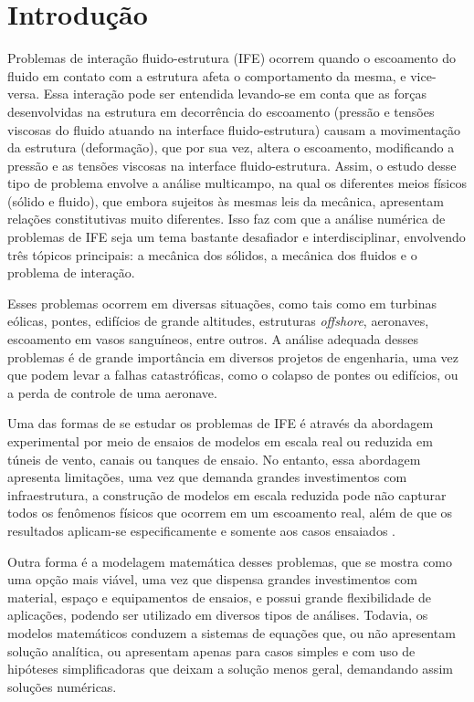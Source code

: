 \chapter{Introdução}\label{CapIntroducao}

Problemas de interação fluido-estrutura (IFE) ocorrem quando o escoamento do fluido em contato com a estrutura afeta o comportamento da mesma, e vice-versa. Essa interação pode ser entendida levando-se em conta que as forças desenvolvidas na estrutura em decorrência do escoamento (pressão e tensões viscosas do fluido atuando na interface fluido-estrutura) causam a movimentação da estrutura (deformação), que por sua vez, altera o escoamento, modificando a pressão e as tensões viscosas na interface fluido-estrutura. Assim, o estudo desse tipo de problema envolve a análise multicampo, na qual os diferentes meios físicos (sólido e fluido), que embora sujeitos às mesmas leis da mecânica, apresentam relações constitutivas muito diferentes. Isso faz com que a análise numérica de problemas de IFE seja um tema bastante desafiador e interdisciplinar, envolvendo três tópicos principais: a mecânica dos sólidos, a mecânica dos fluidos e o problema de interação.

Esses problemas ocorrem em diversas situações, como tais como em turbinas eólicas, pontes, edifícios de grande altitudes, estruturas \textit{offshore}, aeronaves, escoamento em vasos sanguíneos, entre outros. A análise adequada desses problemas é de grande importância em diversos projetos de engenharia, uma vez que podem levar a falhas catastróficas, como o colapso de pontes ou edifícios, ou a perda de controle de uma aeronave.

Uma das formas de se estudar os problemas de IFE é através da abordagem experimental por meio de ensaios de modelos em escala real ou reduzida em túneis de vento, canais ou tanques de ensaio. No entanto, essa abordagem apresenta limitações, uma vez que demanda grandes investimentos com infraestrutura, a construção de modelos em escala reduzida pode não capturar todos os fenômenos físicos que ocorrem em um escoamento real, além de que os resultados aplicam-se especificamente e somente aos casos ensaiados \cite{fernandes2020tecnica}.

Outra forma é a modelagem matemática desses problemas, que se mostra como uma opção mais viável, uma vez que dispensa grandes investimentos com material, espaço e equipamentos de ensaios, e possui grande flexibilidade de aplicações, podendo ser utilizado em diversos tipos de análises. Todavia, os modelos matemáticos conduzem a sistemas de equações que, ou não apresentam solução analítica, ou apresentam apenas para casos simples e com uso de hipóteses simplificadoras que deixam a solução menos geral, demandando assim soluções numéricas.

